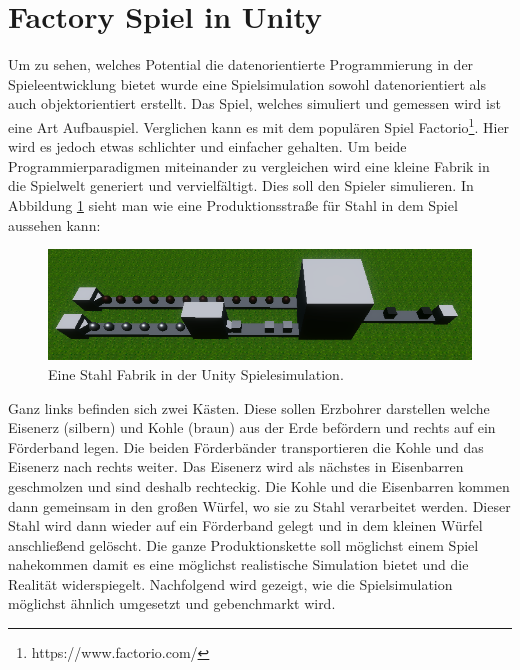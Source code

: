 \section{Factory Spiel in Unity}\label{sec:factory}
Um zu sehen, welches Potential die datenorientierte Programmierung in der Spieleentwicklung bietet wurde eine Spielsimulation sowohl datenorientiert als auch objektorientiert erstellt. Das Spiel, welches simuliert und gemessen wird ist eine Art Aufbauspiel. Verglichen kann es mit dem populären Spiel Factorio\footnote{https://www.factorio.com/}. Hier wird es jedoch etwas schlichter und einfacher gehalten. Um beide Programmierparadigmen miteinander zu vergleichen wird eine kleine Fabrik in die Spielwelt generiert und vervielfältigt. Dies soll den Spieler simulieren. In Abbildung \ref{fig:steel} sieht man wie eine Produktionsstraße für Stahl in dem Spiel aussehen kann:
\begin{figure}[H]
\includegraphics[scale=0.87]{Bilder/Stahl Fabrik.png}
\caption{Eine Stahl Fabrik in der Unity Spielesimulation.}
\label{fig:steel}
\end{figure}
Ganz links befinden sich zwei Kästen. Diese sollen Erzbohrer darstellen welche Eisenerz (silbern) und Kohle (braun) aus der Erde befördern und rechts auf ein Förderband legen. Die beiden Förderbänder transportieren die Kohle und das Eisenerz nach rechts weiter. Das Eisenerz wird als nächstes in Eisenbarren geschmolzen und sind deshalb rechteckig. Die Kohle und die Eisenbarren kommen dann gemeinsam in den großen Würfel, wo sie zu Stahl verarbeitet werden. Dieser Stahl wird dann wieder auf ein Förderband gelegt und in dem kleinen Würfel anschließend gelöscht. Die ganze Produktionskette soll möglichst einem Spiel nahekommen damit es eine möglichst realistische Simulation bietet und die Realität widerspiegelt. Nachfolgend wird gezeigt, wie die Spielsimulation möglichst ähnlich umgesetzt und gebenchmarkt wird.
